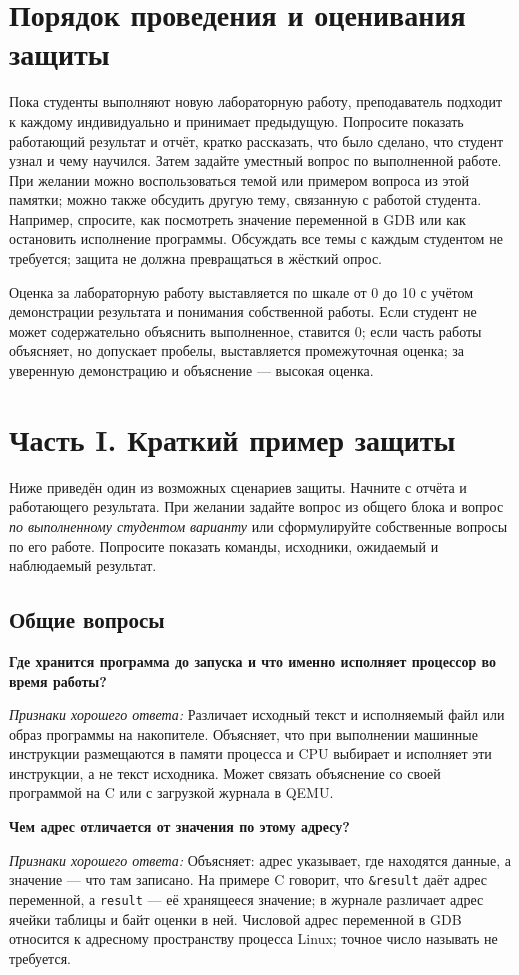\providecommand{\defenseq}[2]{\par\medskip\noindent\textbf{#1}\par\textit{Признаки хорошего ответа:} #2\par}
\providecommand{\defenseplain}[1]{\par\medskip\noindent\textbf{#1}\par}

\section*{Порядок проведения и оценивания защиты}
Пока студенты выполняют новую лабораторную работу, преподаватель подходит
к каждому индивидуально и принимает предыдущую. Попросите показать
работающий результат и отчёт, кратко рассказать, что было сделано, что
студент узнал и чему научился. Затем задайте уместный вопрос по выполненной
работе. При желании можно воспользоваться темой или примером вопроса из
этой памятки; можно также обсудить другую тему, связанную с работой
студента. Например, спросите, как посмотреть значение переменной в GDB
или как остановить исполнение программы. Обсуждать все темы с каждым
студентом не требуется; защита не должна превращаться в жёсткий опрос.

Оценка за лабораторную работу выставляется по шкале от 0 до 10 с учётом
демонстрации результата и понимания собственной работы. Если студент не может
содержательно объяснить выполненное, ставится 0; если часть работы
объясняет, но допускает пробелы, выставляется промежуточная оценка;
за уверенную демонстрацию и объяснение --- высокая оценка.

\section*{Часть I. Краткий пример защиты}
Ниже приведён один из возможных сценариев защиты.
Начните с отчёта и работающего результата. При желании задайте вопрос
из общего блока и вопрос \emph{по выполненному студентом варианту}
или сформулируйте собственные вопросы по его работе. Попросите показать
команды, исходники, ожидаемый и наблюдаемый результат.

\subsection*{Общие вопросы}
\defenseq{Где хранится программа до запуска и что именно исполняет процессор во время работы?}{Различает исходный текст и исполняемый файл или образ программы на накопителе. Объясняет, что при выполнении машинные инструкции размещаются в памяти процесса и CPU выбирает и исполняет эти инструкции, а не текст исходника. Может связать объяснение со своей программой на C или с загрузкой журнала в QEMU.}
\defenseq{Чем адрес отличается от значения по этому адресу?}{Объясняет: адрес указывает, где находятся данные, а значение --- что там записано. На примере C говорит, что \texttt{\&result} даёт адрес переменной, а \texttt{result} --- её хранящееся значение; в журнале различает адрес ячейки таблицы и байт оценки в ней. Числовой адрес переменной в GDB относится к адресному пространству процесса Linux; точное число называть не требуется.}

